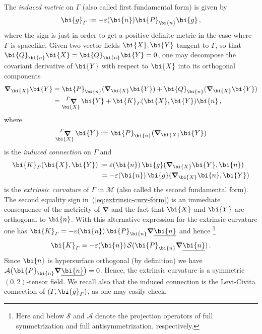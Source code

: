 \documentclass
[rmp,aps,twocolumn,showpacs,preprintnumbers,amsmath,amssymb]{revtex4}
\theoremstyle{plain}
\theoremstyle{definition}
\theoremstyle{remark}
\newcommand{\ul}[1]{\underline{#1}}
\DeclareMathOperator{\LC}{\bm{\nabla}}        %
\newcommand{\bnabla}{\boldsymbol{\nabla}}     %
\newcommand{\M}{\mathcal{M}}                      %
\newcommand{\gG}{\g_\varGamma}                    %
\DeclareMathOperator{\LCG}{\sideset{^\varGamma}{}{\LC}} %
\newcommand{\g}{\bg}                            %
\newcommand{\bg}{\bi{g}}
\newcommand{\bn}{\bi{n}}
\newcommand{\bK}{\bi{K}}
\newcommand{\bP}{\bi{P}}
\newcommand{\bQ}{\bi{Q}}
\newcommand{\bX}{\bi{X}}
\newcommand{\bY}{\bi{Y}}
\begin{document}
The \emph{induced metric} on $\varGamma$ (also called first fundamental form) 
is given by
%
\begin{equation}\label{eq:induced-metric}
  \g_\varGamma := -\varepsilon(\bn)\bP_\bn \g \,,
\end{equation}
%
where the sign is just in order to get a positive definite metric in the
case where $\varGamma$ is spacelike. Given two vector fields $\bX,\bY$ 
tangent to $\varGamma$, so that $\bQ_\bn\bX=\bQ_\bn\bY=0$, one 
may decompose the covariant derivative of $\bY$ with respect to $\bX$ 
into its orthogonal components
%
\begin{align}
  \bnabla_\bX\bY &= \bP_\bn(\bnabla_\bX\bY) + \bQ_\bn(\bnabla_\bX\bY)
                 \nonumber \\
                 &= \LCG_\bX\bY + \bK_\varGamma(\bX,\bY)\bn\,, 
  \label{eq:nabla-decomp-submf}
\end{align}
%
where 
%
\begin{equation}\label{eq:induced-LC}
  \LCG_\bX\bY := \bP_\bn(\bnabla_\bX\bY)
\end{equation}
%
is the \emph{induced connection} on $\varGamma$
and 
%
\begin{align}\label{eq:extrinsic-curv-form}
  \bK_\varGamma(\bX,\bY) &:= \varepsilon(\bn)\,\g(\bnabla_\bX\bY,\bn) 
                         \nonumber \\
                         &\phantom{:}=-\varepsilon(\bn)\,\g(\bnabla_\bX\bn,\bY)
\end{align}
%
is the \emph{extrinsic curvature} of $\varGamma$ in $\M$ (also called the
second fundamental form). The second equality sign 
in~(\ref{eq:extrinsic-curv-form}) is an immediate consequence of the metricity 
of $\bnabla$ and the fact that $\bX$ and $\bY$ are orthogonal to $\bn$. 
With this alternative expression for the extrinsic curvature one has 
$\bK_\varGamma = -\varepsilon(\bn)\,\bP_\bn\bnabla\ul{\bn}$ and hence%
\footnote{Here and below $\mathcal{S}$ and $\mathcal{A}$ denote the 
projection operators of full symmetrization and full antisymmetrization, 
respectively.}
%
\begin{equation}\label{eq:extrinsic-curv-form-SDn}
  \bK_\varGamma = -\varepsilon(\bn)\,\mathcal{S}(\bP_\bn\bnabla\ul{\bn})\,.
\end{equation}
%
Since $\bn$ is hypersurface orthogonal (by definition) we have 
$\mathcal{A}\bigl(\bP_\bn\bnabla\ul{\bn}\bigr)=0$.  Hence, 
the extrinsic curvature is a symmetric $(0,2)$-tensor field. We recall also 
that the induced connection is the Levi-Civita connection of 
$(\varGamma,\gG)$, as one may easily check. 
\end{document}
